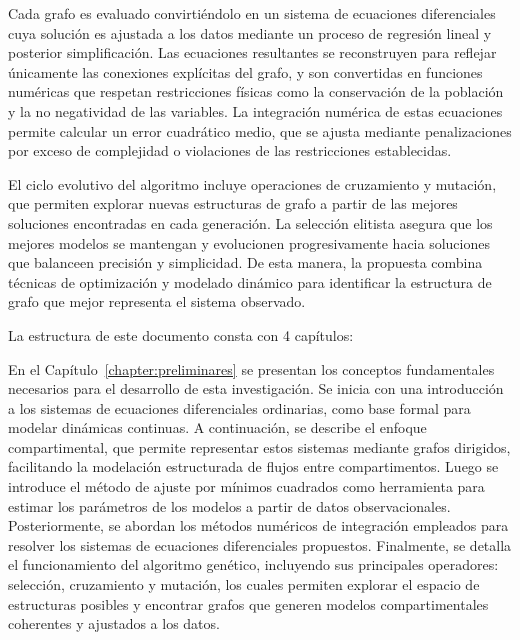 Cada grafo es evaluado convirtiéndolo en un sistema de ecuaciones di\-fe\-ren\-cia\-les cuya solución es ajustada a los datos mediante un proceso de regresión lineal 
y posterior simplificación. Las ecuaciones resultantes se re\-cons\-tru\-yen para reflejar únicamente las conexiones explícitas del grafo, y son convertidas en 
funciones numéricas que respetan restricciones físicas como la conservación de la población y la no negatividad de las variables. La integración numérica de 
estas ecuaciones permite calcular un error cuadrático medio, que se ajusta mediante penalizaciones por exceso de complejidad o violaciones de las restricciones 
establecidas.

El ciclo evolutivo del algoritmo incluye operaciones de cruzamiento y mutación, que permiten explorar nuevas estructuras de grafo a partir de las mejores soluciones 
encontradas en cada generación. La selección elitista asegura que los mejores modelos se mantengan y evolucionen progresivamente hacia soluciones que balanceen 
precisión y simplicidad. De esta manera, la propuesta combina técnicas de optimización y modelado dinámico para identificar la estructura de grafo que mejor 
representa el sistema observado.

La estructura de este documento consta con 4 cap\'itulos: 

En el Capítulo~\ref{chapter:preliminares} se presentan los conceptos fundamentales necesarios para el desarrollo de esta investigación. Se inicia con una introducción a los sistemas de 
ecuaciones diferenciales ordinarias, como base formal para modelar dinámicas continuas. A continuación, se describe el enfoque compartimental, que permite representar 
estos sistemas mediante grafos dirigidos, facilitando la modelación estructurada de flujos entre compartimentos. Luego se introduce el método de ajuste por mínimos 
cuadrados como herramienta para estimar los parámetros de los modelos a partir de datos observacionales. Posteriormente, se abordan los métodos numéricos de 
integración empleados para resolver los sistemas de ecuaciones diferenciales propuestos. 
Finalmente, se detalla el funcionamiento del algoritmo genético, incluyendo sus principales operadores: selección, cruzamiento y mutación, los cuales permiten 
explorar el espacio de estructuras posibles y encontrar grafos que generen modelos compartimentales coherentes y ajustados a los datos.

